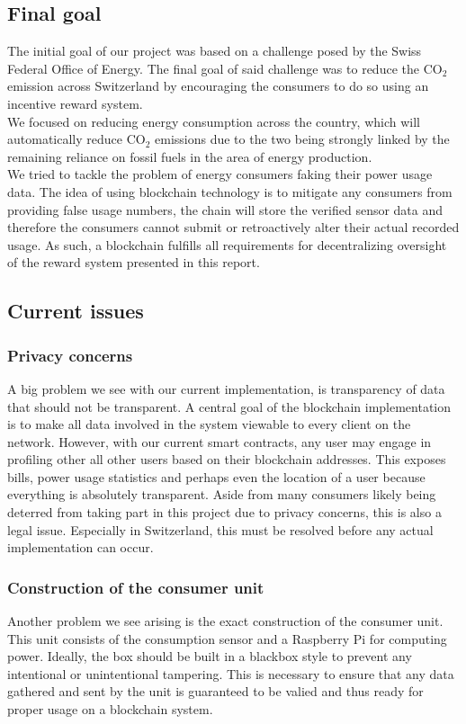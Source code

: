\documentclass[11pt]{article}
\begin{document}
\subsection{Final goal}
The initial goal of our project was based on a challenge posed by the Swiss Federal Office of Energy. The final goal of said challenge was to reduce the CO$_2$ emission across Switzerland by encouraging the consumers to do so using an incentive reward system.\\
We focused on reducing energy consumption across the country, which will automatically reduce CO$_2$ emissions due to the two being strongly linked by the remaining reliance on fossil fuels in the area of energy production.\\
We tried to tackle the problem of energy consumers faking their power usage data. The idea of using blockchain technology is to mitigate any consumers from providing false usage numbers, the chain will store the verified sensor data and therefore the consumers cannot submit or retroactively alter their actual recorded usage. As such, a blockchain fulfills all requirements for decentralizing oversight of the reward system presented in this report.
\subsection{Current issues}
\subsubsection{Privacy concerns} \label{concl:privacy}
A big problem we see with our current implementation, is transparency of data that should not be transparent. A central goal of the blockchain implementation is to make all data involved in the system viewable to every client on the network. However, with our current smart contracts, any user may engage in profiling other all other users based on their blockchain addresses. This exposes bills, power usage statistics and perhaps even the location of a user because everything is absolutely transparent. Aside from many consumers likely being deterred from taking part in this project due to privacy concerns, this is also a legal issue. Especially in Switzerland, this must be resolved before any actual implementation can occur.
\subsubsection{Construction of the consumer unit}
Another problem we see arising is the exact construction of the consumer unit. This unit consists of the consumption sensor and a Raspberry Pi for computing power. Ideally, the box should be built in a blackbox style to prevent any intentional or unintentional tampering. This is necessary to ensure that any data gathered and sent by the unit is guaranteed to be valied and thus ready for proper usage on a blockchain system.
\end{document}
